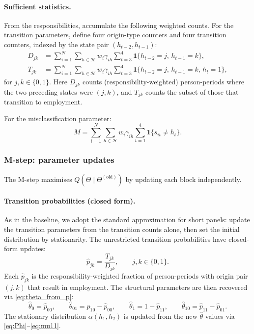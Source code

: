 \paragraph{Sufficient statistics.}
From the responsibilities, accumulate the following weighted counts.
For the transition parameters, define four origin-type counters and
four transition counters, indexed by the state pair
$(h_{t-2}, h_{t-1})$:
\begin{align}
D_{jk} &= \sum_{i=1}^{N} \sum_{h \in \mathcal{H}} w_i \gamma_{ih}
  \sum_{t=3}^{4} \mathbf{1}\{h_{t-2} = j,\, h_{t-1} = k\},
  \label{eq:ar2_suff_D} \\[4pt]
T_{jk} &= \sum_{i=1}^{N} \sum_{h \in \mathcal{H}} w_i \gamma_{ih}
  \sum_{t=3}^{4} \mathbf{1}\{h_{t-2} = j,\, h_{t-1} = k,\, h_t = 1\},
  \label{eq:ar2_suff_T}
\end{align}
for $j, k \in \{0, 1\}$. Here $D_{jk}$ counts
(responsibility-weighted) person-periods where the two preceding states
were $(j, k)$, and $T_{jk}$ counts the subset of those that transition
to employment.

For the misclassification parameter:
\begin{equation}
M = \sum_{i=1}^{N} \sum_{h \in \mathcal{H}} w_i \gamma_{ih}
  \sum_{t=1}^{4} \mathbf{1}\{s_{it} \neq h_t\}.
  \label{eq:ar2_suff_M}
\end{equation}

\subsubsection{M-step: parameter updates}
\label{sec:ar2_mstep}

The M-step maximises $Q(\Theta \mid \Theta^{(\mathrm{old})})$ by
updating each block independently.

\paragraph{Transition probabilities (closed form).}
As in the baseline, we adopt the standard approximation for short
panels: update the transition parameters from the transition counts
alone, then set the initial distribution by stationarity. The
unrestricted transition probabilities have closed-form updates:
\begin{equation}
\hat{p}_{jk} = \frac{T_{jk}}{D_{jk}}, \qquad j, k \in \{0, 1\}.
\label{eq:ar2_mstep_p}
\end{equation}
Each $\hat{p}_{jk}$ is the responsibility-weighted fraction of
person-periods with origin pair $(j, k)$ that result in employment.
The structural parameters are then recovered via
\eqref{eq:theta_from_p}:
\begin{equation}
\hat{\theta}_0 = \hat{p}_{00}, \qquad
\hat{\theta}_{01} = \hat{p}_{10} - \hat{p}_{00}, \qquad
\hat{\theta}_1 = 1 - \hat{p}_{11}, \qquad
\hat{\theta}_{10} = \hat{p}_{11} - \hat{p}_{01}.
\label{eq:ar2_mstep_theta}
\end{equation}
The stationary distribution $\alpha(h_1, h_2)$ is updated from the new
$\hat{\theta}$ values via
\eqref{eq:Phi}--\eqref{eq:mu11}.

